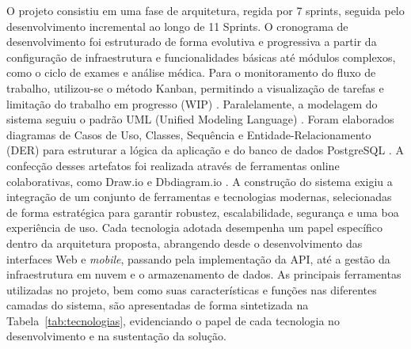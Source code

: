 \documentclass[conference,a4paper,10pt]{IEEETran}
\begin{document}
O projeto consistiu em uma fase de arquitetura, regida por 7 sprints, seguida pelo desenvolvimento incremental ao longo de 11 Sprints. O cronograma de desenvolvimento foi estruturado de forma evolutiva e progressiva a partir da configuração de infraestrutura e funcionalidades básicas até módulos complexos, como o ciclo de exames e análise médica. 
Para o monitoramento do fluxo de trabalho, utilizou-se o método Kanban, permitindo a visualização de tarefas e limitação do trabalho em progresso (WIP) \cite{anderson_kanban_2012}. Paralelamente, a modelagem do sistema seguiu o padrão UML (Unified Modeling Language) \cite{larman_UML, booch_UML}. Foram elaborados diagramas de Casos de Uso, Classes, Sequência e Entidade-Relacionamento (DER) para estruturar a lógica da aplicação e do banco de dados PostgreSQL \cite{PostgreSQL2024Docs}. A confecção desses artefatos foi realizada através de ferramentas online colaborativas, como Draw.io e Dbdiagram.io \cite{drawio_website, dbdiagram_website}.
A construção do sistema exigiu a integração de um conjunto de ferramentas e tecnologias modernas, selecionadas de forma estratégica para garantir robustez, escalabilidade, segurança e uma boa experiência de uso. Cada tecnologia adotada desempenha um papel específico dentro da arquitetura proposta, abrangendo desde o desenvolvimento das interfaces Web e \textit{mobile}, passando pela implementação da API, até a gestão da infraestrutura em nuvem e o armazenamento de dados. As principais ferramentas utilizadas no projeto, bem como suas características e funções nas diferentes camadas do sistema, são apresentadas de forma sintetizada na Tabela~\ref{tab:tecnologias}, evidenciando o papel de cada tecnologia no desenvolvimento e na sustentação da solução.
\end{document}
